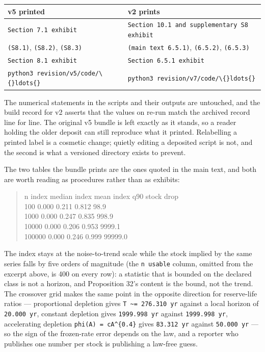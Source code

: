 \documentclass[11pt]{article}
\begin{document}
\begin{longtable}{@{}l|p{109mm}@{}}
\toprule
v5 printed & v2 prints \\
\midrule
\texttt{Section 7.1 exhibit} & \texttt{Section 10.1 and supplementary S8 exhibit} \\
\texttt{(S8.1)}, \texttt{(S8.2)}, \texttt{(S8.3)} & \texttt{(main text 6.5.1)}, \texttt{(6.5.2)}, \texttt{(6.5.3)} \\
\texttt{Section 8.1 exhibit} & \texttt{Section 6.5.1 exhibit} \\
\texttt{python3 revision/v5/code/\textbackslash\{\}ldots\{\}} & \texttt{python3 revision/v7/code/\textbackslash\{\}ldots\{\}} \\
\bottomrule
\end{longtable}

The numerical statements in the scripts and their outputs are untouched, and the build record for v2 asserts that the values on re-run match the archived record line for line. The original v5 bundle is left exactly as it stands, so a reader holding the older deposit can still reproduce what it printed. Relabelling a printed label is a cosmetic change; quietly editing a deposited script is not, and the second is what a versioned directory exists to prevent.

The two tables the bundle prints are the ones quoted in the main text, and both are worth reading as procedures rather than as exhibits:

\begin{quote}\ttfamily\footnotesize\raggedright\setlength{\parskip}{0pt}
       n   index median     index mean      index q90     stock drop\\
     100          0.000          0.211          0.812           98.9\\
    1000          0.000          0.247          0.835          998.9\\
   10000          0.000          0.206          0.953         9999.1\\
  100000          0.000          0.246          0.999        99999.0
\end{quote}

The index stays at the noise-to-trend scale while the stock implied by the same series falls by five orders of magnitude (the \texttt{n usable} column, omitted from the excerpt above, is 400 on every row): a statistic that is bounded on the declared class is not a horizon, and Proposition 32's content is the bound, not the trend. The crossover grid makes the same point in the opposite direction for reserve-life ratios --- proportional depletion gives \texttt{T \textasciitilde{}= 276.310 yr} against a local horizon of \texttt{20.000 yr}, constant depletion gives \texttt{1999.998 yr} against \texttt{1999.998 yr}, accelerating depletion \texttt{phi(A) = cA\textasciicircum{}\{0.4\}} gives \texttt{83.312 yr} against \texttt{50.000 yr} --- so the sign of the frozen-rate error depends on the law, and a reporter who publishes one number per stock is publishing a law-free guess.
\end{document}
